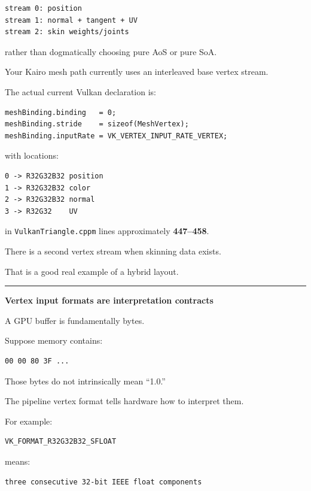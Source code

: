 \begin{verbatim}
stream 0: position
stream 1: normal + tangent + UV
stream 2: skin weights/joints
\end{verbatim}

rather than dogmatically choosing pure AoS or pure SoA.

Your Kairo mesh path currently uses an interleaved base vertex stream.

The actual current Vulkan declaration is:

\begin{verbatim}
meshBinding.binding   = 0;
meshBinding.stride    = sizeof(MeshVertex);
meshBinding.inputRate = VK_VERTEX_INPUT_RATE_VERTEX;
\end{verbatim}

with locations:

\begin{verbatim}
0 -> R32G32B32 position
1 -> R32G32B32 color
2 -> R32G32B32 normal
3 -> R32G32    UV
\end{verbatim}

in \texttt{VulkanTriangle.cppm} lines approximately \textbf{447--458}.

There is a second vertex stream when skinning data exists.

That is a good real example of a hybrid layout.

\begin{center}\rule{0.5\linewidth}{0.5pt}\end{center}

\textbf{Vertex input formats are interpretation contracts}

A GPU buffer is fundamentally bytes.

Suppose memory contains:

\begin{verbatim}
00 00 80 3F ...
\end{verbatim}

Those bytes do not intrinsically mean ``1.0.''

The pipeline vertex format tells hardware how to interpret them.

For example:

\begin{verbatim}
VK_FORMAT_R32G32B32_SFLOAT
\end{verbatim}

means:

\begin{verbatim}
three consecutive 32-bit IEEE float components
\end{verbatim}

